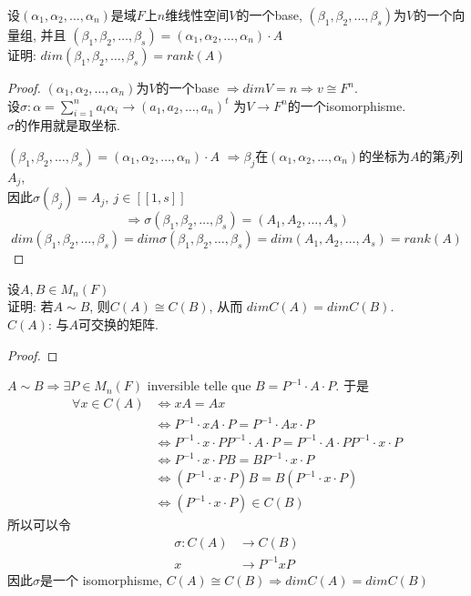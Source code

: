 \begin{example}
设$(\alpha_1, \alpha_2, \ldots, \alpha_n)$是域$F$上$n$维线性空间$V$的一个base, $(\beta_1, \beta_2, \ldots, \beta_s)$为$V$的一个向量组, 并且
$(\beta_1, \beta_2, \ldots, \beta_s) = (\alpha_1, \alpha_2, \ldots, \alpha_n) \cdot A$ \\
证明: $dim(\beta_1, \beta_2, \ldots, \beta_s) = rank(A)$
\end{example}
\begin{proof}
$(\alpha_1, \alpha_2, \ldots, \alpha_n)$为$V$的一个base $\Rightarrow dimV = n \Rightarrow v \cong F^n$. \\
设$\sigma: \alpha = \sum_{i = 1}^n a_i \alpha_i \rightarrow (a_1, a_2, \ldots, a_n)^t$ 为$V \rightarrow F^n$的一个isomorphisme. \\
$\sigma$的作用就是取坐标.

$(\beta_1, \beta_2, \ldots, \beta_s) = (\alpha_1, \alpha_2, \ldots, \alpha_n) \cdot A$
$\Rightarrow \beta_j$在$(\alpha_1, \alpha_2, \ldots, \alpha_n)$的坐标为$A$的第$j$列$A_j$, \\
因此$\sigma(\beta_j) = A_j,~ j \in [[1, s]]$
$$ \Rightarrow \sigma(\beta_1, \beta_2, \ldots, \beta_s) = (A_1, A_2, \ldots, A_s) $$
$$ dim(\beta_1, \beta_2, \ldots, \beta_s) = dim \sigma(\beta_1, \beta_2, \ldots, \beta_s) = dim(A_1, A_2, \ldots, A_s) = rank(A) $$
\end{proof}

\begin{example}
设$A, B \in M_n(F)$ \\
证明: 若$A \sim B$, 则$C(A) \cong C(B)$, 从而 $dim C(A) = dim C(B)$.\\
$C(A)$: 与$A$可交换的矩阵.
\end{example}
\begin{proof}
\end{proof}
$A \sim B \Rightarrow \exists P \in M_n(F)$ inversible telle que $B = P^{-1} \cdot A \cdot P$. 于是
$$
\begin{aligned}
\forall x \in C(A)
& \Leftrightarrow xA = Ax \\
& \Leftrightarrow P^{-1} \cdot xA \cdot P = P^{-1} \cdot Ax \cdot P \\
& \Leftrightarrow P^{-1} \cdot x \cdot P P^{-1} \cdot A \cdot P = P^{-1} \cdot A \cdot P P^{-1} \cdot x \cdot P \\
& \Leftrightarrow P^{-1} \cdot x \cdot P B = B P^{-1} \cdot x \cdot P \\
& \Leftrightarrow (P^{-1} \cdot x \cdot P) B = B (P^{-1} \cdot x \cdot P) \\
& \Leftrightarrow (P^{-1} \cdot x \cdot P) \in C(B)
\end{aligned}
$$
所以可以令
$$
\begin{aligned}
\sigma: C(A) & \rightarrow C(B) \\
		 x   & \rightarrow P^{-1} x P
\end{aligned}
$$
因此$\sigma$是一个 isomorphisme, $C(A) \cong C(B) \Rightarrow dim C(A) = dim C(B)$

